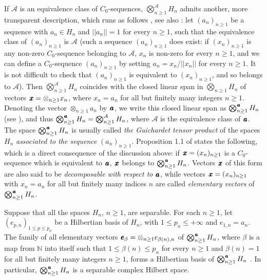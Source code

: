 \documentclass[11pt,english,a4paper]{smfart}
\numberwithin{equation}{section}
\theoremstyle{definition}
\begin{document}
\par\smallskip 
If ${\mathcal{A}}$ is an equivalence class of $C_{0}$-sequences, ${\bigotimes_{n\ge 1}^{{\mathcal{A}}}{H_{n}}}$ 
admits another, more transparent description, which runs as follows 
\cite[Lem.~4.1.2]{VN}, see also \cite[Rem.~1.1]{Gui}: let ${({a_{n}})_{n\ge 1}}$ be a 
sequence with ${a_{n}}\in {H_{n}} $ and $||{a_{n}}||=1$ for every ${n\ge 1}$, such that the equivalence class of 
${({a_{n}})_{n\ge 1}}$ is ${\mathcal{A}}$ (such a sequence ${({a_{n}})_{n\ge 1}} $ does exist: if ${({x_{n}})_{n\ge 1}} $ is any non-zero $C_{0}$-sequence belonging to ${\mathcal{A}}$, $x_{n}$ is non-zero for every $n\ge 1$, and we can define a $C_{0}$-sequence ${({a_{n}})_{n\ge 1}} $ by setting $a_{n}=x_{n}/||x_{n}||$ for every $n\ge 1$. It is not difficult to check that ${({a_{n}})_{n\ge 1}} $ is equivalent to ${({x_{n}})_{n\ge 1}} $, and so belongs to ${\mathcal{A}}$). Then ${\bigotimes_{n\ge 1}^{{\mathcal{A}}}{H_{n}}}$ coincides with the closed linear span 
in ${\bigotimes_{n\ge 1}^{{}}{H_{n}}}$ of vectors ${\mkern 1.5 mu\pmb{x}}={{\otimes}_{n\ge 1}{x_{n}}}$, where ${x_{n}}={a_{n}}$ for all 
but finitely many  integers ${n\ge 1}$. Denoting the vector ${{\otimes}_{n\ge 1}{a_{n}}}$ by ${\mkern 1.5 mu\pmb{a}}$, 
we write this closed linear span as ${\bigotimes_{n\ge 1}^{\mkern 1.5 mu\pmb{a}}{H_{n}}}$ (see \cite{Gui}), and 
thus ${\bigotimes_{n\ge 1}^{\mkern 1.5 mu\pmb{a}}{H_{n}}}={\bigotimes_{n\ge 1}^{{\mathcal{A}}}{H_{n}}}$, where ${\mathcal{A}}$ is the equivalence class of 
${\mkern 1.5 mu\pmb{a}}$. The space ${\bigotimes_{n\ge 1}^{\mkern 1.5 mu\pmb{a}}{H_{n}}}$ is usually called \emph{the Guichardet 
tensor product} of the spaces ${H_{n}} $ \emph{associated to the sequence} 
${({a_{n}})_{n\ge 1}}$. Proposition 1.1 of \cite{Gui} states the following, which is a direct consequence of
the discussion above: if ${\mkern 1.5 mu\pmb{x}}={({x_{n}})_{n\ge 1}}$ is a $C_{0}$-sequence 
which is equivalent to ${\mkern 1.5 mu\pmb{a}}$, ${\mkern 1.5 mu\pmb{x}}$ belongs to ${\bigotimes_{n\ge 1}^{\mkern 1.5 mu\pmb{a}}{H_{n}}}$. Vectors 
${\mkern 1.5 mu\pmb{x}}$ of this form are also said to be \emph{decomposable with respect 
to} ${\mkern 1.5 mu\pmb{a}}$, while vectors ${\mkern 1.5 mu\pmb{x}}={({x_{n}})_{n\ge 1}}$ with ${x_{n}}={a_{n}}$ for all but finitely 
many indices $n$ are called \emph{elementary vectors} of ${\bigotimes_{n\ge 1}^{\mkern 1.5 mu\pmb{a}}{H_{n}}}$.
\par\smallskip
Suppose that all the spaces ${H_{n}}$, ${n\ge 1}$, are separable.
For each ${n\ge 1}$, let $(e_{p,n})_{1\le p\le p_{n}}$ be a Hilbertian basis of 
${H_{n}} $, with $1\le p_{n}\le+\infty $ and $e_{1,n}=a_{n}$. The family of all
elementary vectors ${\mkern 1.5 mu\pmb{e}}_{\beta }={\otimes}_{n\ge 1}e_{\beta (n),n}$ of ${\bigotimes_{n\ge 1}^{\mkern 1.5 mu\pmb{a}}{H_{n}}}$, where 
$\beta $ is a map from ${\ensuremath{\mathbb N}}$ into itself such that $1\le\beta (n)\le p_{n}$ 
for every ${n\ge 1}$ and $\beta (n)=1$ for all but finitely many integers $n\ge 
1$, forms a Hilbertian basis of ${\bigotimes_{n\ge 1}^{\mkern 1.5 mu\pmb{a}}{H_{n}}}$ \cite[Lem.~4.1.4]{VN}. In 
particular, ${\bigotimes_{n\ge 1}^{\mkern 1.5 mu\pmb{a}}{H_{n}}}$ is a separable complex Hilbert space.
\end{document}
